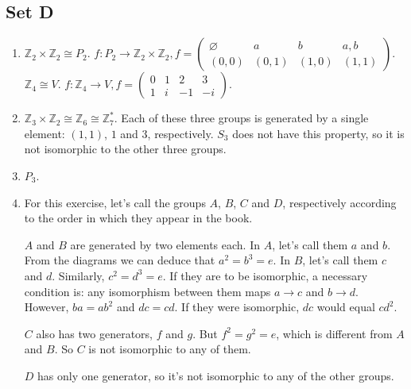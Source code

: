 \documentclass{article}
\let\emptyset\varnothing
\begin{document}
\subsection{Set D}
\begin{enumerate}
    \item $ \mathbb{Z}_2 \times \mathbb{Z}_2 \cong P_2 $. $ f: P_2 \rightarrow \mathbb{Z}_2 \times \mathbb{Z}_2, f = 
    \begin{pmatrix}
        \emptyset & {a}    & {b}    & {a, b}\\
        (0, 0)    & (0, 1) & (1, 0) & (1, 1)
    \end{pmatrix} $.\\
    $ \mathbb{Z}_4 \cong V $. $ f: \mathbb{Z}_4 \rightarrow V, f = 
    \begin{pmatrix}
        0 & 1 &  2 & 3 \\
        1 & i & -1 & -i
    \end{pmatrix}$.
    
    \item $ \mathbb{Z}_3 \times \mathbb{Z}_2 \cong \mathbb{Z}_6 \cong \mathbb{Z}_7^* $. Each of these three groups is generated by a single element: $ (1, 1) $, $ 1 $ and $ 3 $, respectively. $ S_3 $ does not have this property, so it is not isomorphic to the other three groups.
    
    \item $ P_3 $.
    
    \item For this exercise, let's call the groups $ A $, $ B $, $ C $ and $ D $, respectively according to the order in which they appear in the book.

    $ A $ and $ B $ are generated by two elements each. In $ A $, let's call them $ a $ and $ b $. From the diagrams we can deduce that $ a^2 = b^3 = e $. In $ B $, let's call them $ c $ and $ d $. Similarly, $ c^2 = d^3 = e $. If they are to be isomorphic, a necessary condition is: any isomorphism between them maps $ a \to c $ and $ b \to d $. However, $ ba = ab^2 $ and $ dc = cd $. If they were isomorphic, $ dc $ would equal $ cd^2 $.

    $ C $ also has two generators, $ f $ and $ g $. But $ f^2 = g^2 = e $, which is different from $ A $ and $ B $. So $ C $ is not isomorphic to any of them.

    $ D $ has only one generator, so it's not isomorphic to any of the other groups.
\end{enumerate}
\end{document}
